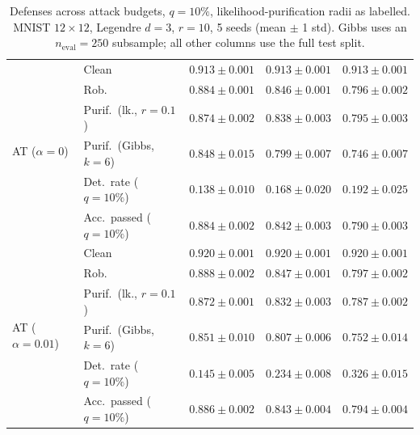 \begin{table}[htbp]
\begin{tabular}{@{}llrrr@{}}
    \cmidrule(lr){1-5}
    \multirow{6}{*}{AT ($\alpha{=}0$)} & Clean & $0.913 \pm 0.001$ & $0.913 \pm 0.001$ & $0.913 \pm 0.001$ \\
     & Rob. & $0.884 \pm 0.001$ & $0.846 \pm 0.001$ & $0.796 \pm 0.002$ \\
     & Purif.\ (lk., $r{=}0.1$) & $0.874 \pm 0.002$ & $\mathbf{0.838 \pm 0.003}$ & $\mathbf{0.795 \pm 0.003}$ \\
     & Purif.\ (Gibbs, $k{=}6$) & $0.848 \pm 0.015$ & $0.799 \pm 0.007$ & $0.746 \pm 0.007$ \\
     & Det.\ rate ($q{=}10\%$) & $0.138 \pm 0.010$ & $0.168 \pm 0.020$ & $0.192 \pm 0.025$ \\
     & Acc.\ passed ($q{=}10\%$) & $0.884 \pm 0.002$ & $0.842 \pm 0.003$ & $0.790 \pm 0.003$ \\
    \cmidrule(lr){1-5}
    \multirow{6}{*}{AT ($\alpha{=}0.01$)} & Clean & $0.920 \pm 0.001$ & $0.920 \pm 0.001$ & $0.920 \pm 0.001$ \\
     & Rob. & $\mathbf{0.888 \pm 0.002}$ & $\mathbf{0.847 \pm 0.001}$ & $\mathbf{0.797 \pm 0.002}$ \\
     & Purif.\ (lk., $r{=}0.1$) & $0.872 \pm 0.001$ & $0.832 \pm 0.003$ & $0.787 \pm 0.002$ \\
     & Purif.\ (Gibbs, $k{=}6$) & $0.851 \pm 0.010$ & $\mathbf{0.807 \pm 0.006}$ & $\mathbf{0.752 \pm 0.014}$ \\
     & Det.\ rate ($q{=}10\%$) & $0.145 \pm 0.005$ & $0.234 \pm 0.008$ & $0.326 \pm 0.015$ \\
     & Acc.\ passed ($q{=}10\%$) & $\mathbf{0.886 \pm 0.002}$ & $\mathbf{0.843 \pm 0.004}$ & $\mathbf{0.794 \pm 0.004}$ \\
    \bottomrule
  \end{tabular}
  \caption{Defenses across attack budgets, $q{=}10\%$, likelihood-purification radii as labelled. MNIST $12\times12$, Legendre $d{=}3$, $r{=}10$, 5 seeds (mean $\pm$ 1 std). Gibbs uses an $n_{\mathrm{eval}}=250$ subsample; all other columns use the full test split.}
  \label{tab:mnist_r12_models_r10}
\end{table}
